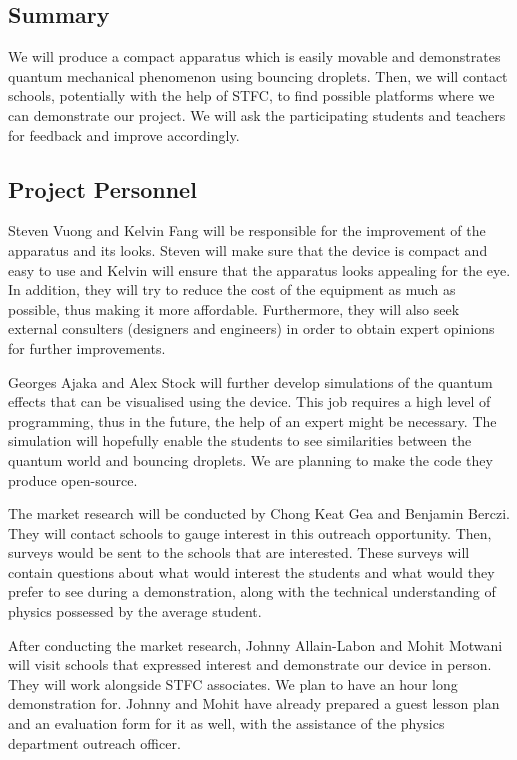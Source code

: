 \subsection{Summary}

We will produce a compact apparatus which is easily movable and demonstrates quantum mechanical phenomenon using bouncing droplets. Then, we will contact schools, potentially with the help of STFC, to find possible platforms where we can demonstrate our project. We will ask the participating students and teachers for feedback and improve accordingly. 


\bigskip

\subsection{Project Personnel}

Steven Vuong and Kelvin Fang will be responsible for the improvement of the apparatus and its looks. Steven will make sure that the device is compact and easy to use and Kelvin will ensure that the apparatus looks appealing for the eye. In addition, they will try to reduce the cost of the equipment as much as possible, thus making it more affordable. Furthermore, they will also seek external consulters (designers and engineers) in order to obtain expert opinions for further improvements.

Georges Ajaka and Alex Stock will further develop simulations of the quantum effects that can be visualised using the device. This job requires a high level of programming, thus in the future, the help of an expert might be necessary. The simulation will hopefully enable the students to see similarities between the quantum world and bouncing droplets. We are planning to make the code they produce open-source.

The market research will be conducted by Chong Keat Gea and Benjamin Berczi. They will contact schools to gauge interest in this outreach opportunity. Then, surveys would be sent to the schools that are interested. These surveys will contain questions about what would interest the students and what would they prefer to see during a demonstration, along with the technical understanding of physics possessed by the average student. 

After conducting the market research, Johnny Allain-Labon and Mohit Motwani will visit schools that expressed interest and demonstrate our device in person. They will work alongside STFC associates. We plan to have an hour long demonstration for. Johnny and Mohit have already prepared a guest lesson plan and an evaluation form for it as well, with the assistance of the physics department outreach officer. \ 

